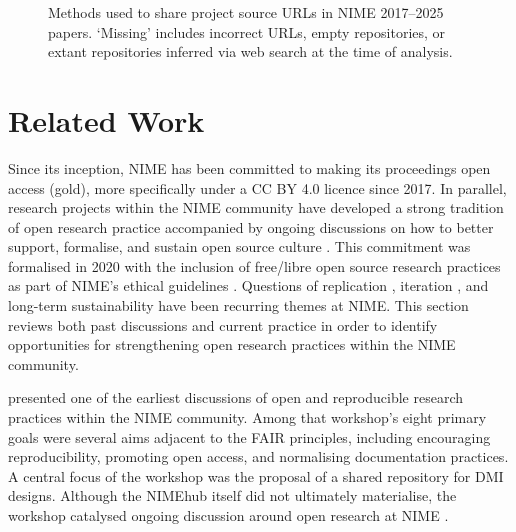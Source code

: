 \begin{figure}
    \caption{Methods used to share project source URLs in NIME 2017--2025 papers. `Missing' includes incorrect URLs, empty repositories, or extant repositories inferred via web search at the time of analysis.}
    \label{fig:git_placement}
\end{figure}

\section{Related Work}

Since its inception, NIME has been committed to making its proceedings open access (gold), more specifically under a CC BY 4.0 licence since 2017.
In parallel, research projects within the NIME community have developed a strong tradition of open research practice accompanied by ongoing discussions on how to better support, formalise, and sustain open source culture \cite{mcpherson_nimehub_2016}.
This commitment was formalised in 2020 with the inclusion of free/libre open source research practices as part of NIME’s ethical guidelines \cite{nime_ethics_2020}.
Questions of replication \cite{calegario_documentation_2021}, iteration \cite{nime2021_26}, and long-term sustainability \cite{fiordelmondo_longevity_2024} have been recurring themes at NIME.
This section reviews both past discussions and current practice in order to identify opportunities for strengthening open research practices within the NIME community.

\citet{mcpherson_nimehub_2016} presented one of the earliest discussions of open and reproducible research practices within the NIME community. Among that workshop’s eight primary goals were several aims adjacent to the FAIR principles, including encouraging reproducibility, promoting open access, and normalising documentation practices. A central focus of the workshop was the proposal of a shared repository for DMI designs. Although the NIMEhub itself did not ultimately materialise, the workshop catalysed ongoing discussion around open research at NIME \cite{jensenius_open_2019, jensenius_nime_2020}.

